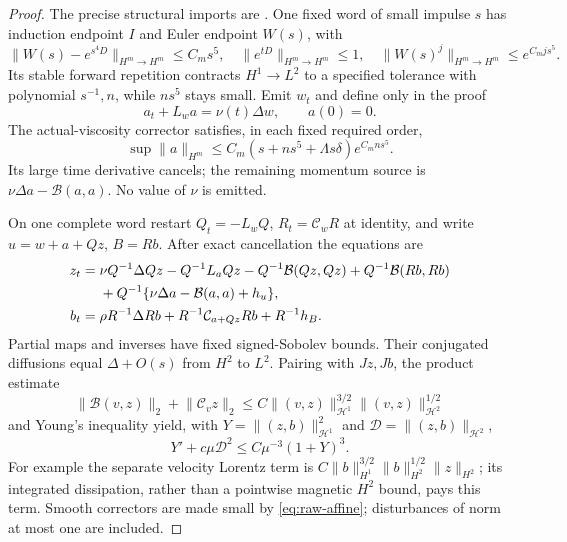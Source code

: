 \documentclass[11pt,a4paper]{amsart}
\theoremstyle{definition}
\theoremstyle{remark}
\numberwithin{equation}{section}
\newcommand{\Bcal}{\mathcal B}
\newcommand{\Ccal}{\mathcal C}
\newcommand{\Hcal}{\mathcal H}
\newcommand{\norm}[1]{\lVert #1\rVert}
\begin{document}
\begin{proof}
The precise structural imports are \cite[Lemma~4.1, Proposition~4.5,
Corollary~4.6, Lemma~4.7]{Common}.  One fixed word of small impulse $s$
has induction endpoint $I$ and Euler endpoint $W(s)$, with
\begin{equation}\label{eq:raw-word}
 \norm{W(s)-e^{s^4D}}_{H^m\to H^m}\le C_ms^5,
 \quad\norm{e^{tD}}_{H^m\to H^m}\le1,
 \quad\norm{W(s)^j}_{H^m\to H^m}\le e^{C_mjs^5}.
\end{equation}
Its stable forward repetition contracts $H^1\to L^2$ to a specified
tolerance with polynomial $s^{-1},n$, while $ns^5$ stays small.  Emit
$w_t$ and define only in the proof
\[
 a_t+L_wa=\nu(t)\Delta w,\qquad a(0)=0.
\]
The actual-viscosity corrector satisfies, in each fixed required order,
\begin{equation}\label{eq:raw-affine}
 \sup\norm a_{H^m}
 \le C_m(s+ns^5+\Lambda s\delta)e^{C_mns^5}.
\end{equation}
Its large time derivative cancels; the remaining momentum source is
$\nu\Delta a-\Bcal(a,a)$.  No value of $\nu$ is emitted.

On one complete word restart $Q_t=-L_wQ$, $R_t=\Ccal_wR$ at identity,
and write $u=w+a+Qz$, $B=Rb$.  After exact cancellation the equations are
\begin{align}\label{eq:raw-equations}
 z_t={}&\nu Q^{-1}\Delta Qz-Q^{-1}L_aQz
 -Q^{-1}\Bcal(Qz,Qz)+Q^{-1}\Bcal(Rb,Rb)\notag\\
 &+Q^{-1}\{\nu\Delta a-\Bcal(a,a)+h_u\},\\
 b_t={}&\rho R^{-1}\Delta Rb+
               R^{-1}\Ccal_{a+Qz}Rb+R^{-1}h_B.\notag
\end{align}
Partial maps and inverses have fixed signed-Sobolev bounds.  Their
conjugated diffusions equal $\Delta+O(s)$ from $H^2$ to $L^2$.
Pairing with $Jz,Jb$, the product estimate
\begin{equation}\label{eq:memory-joint-product}
 \norm{\Bcal(v,z)}_2+\norm{\Ccal_vz}_2
 \le C\norm{(v,z)}_{\Hcal^1}^{3/2}
                       \norm{(v,z)}_{\Hcal^2}^{1/2}
\end{equation}
and Young's inequality yield, with
$Y=\norm{(z,b)}_{\Hcal^1}^2$ and
$\mathcal D=\norm{(z,b)}_{\Hcal^2}$,
\begin{equation}\label{eq:raw-energy}
 Y'+c\mu\mathcal D^2\le C\mu^{-3}(1+Y)^3.
\end{equation}
For example the separate velocity Lorentz term is
$C\norm b_{H^1}^{3/2}\norm b_{H^2}^{1/2}\norm z_{H^2}$;
its integrated dissipation, rather than a pointwise magnetic $H^2$ bound,
pays this term.  Smooth correctors are made small by
\eqref{eq:raw-affine}; disturbances of norm at most one are included.


\end{proof}
\end{document}
